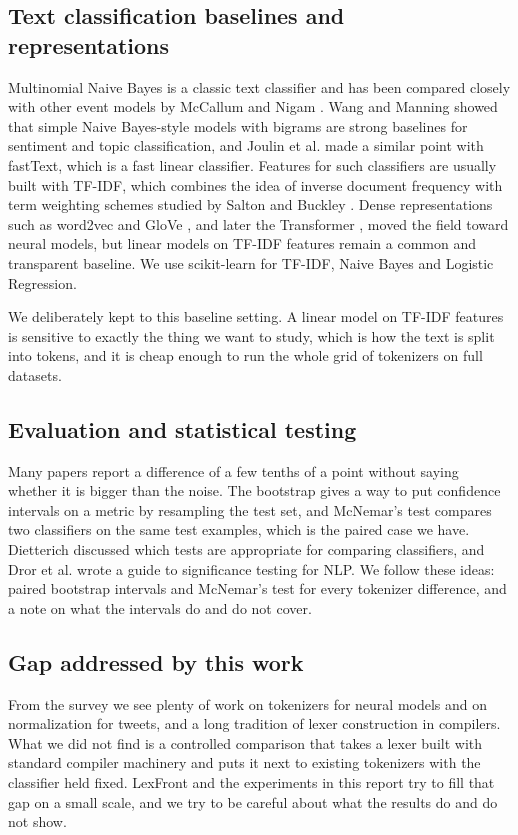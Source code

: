 \documentclass[journal,onecolumn,12pt,a4paper]{IEEEtran}
\begin{document}
\subsection{Text classification baselines and representations}\label{sec:2.4}
Multinomial Naive Bayes is a classic text classifier and has been compared closely with other event models by McCallum and Nigam \cite{r27}. Wang and Manning \cite{r28} showed that simple Naive Bayes-style models with bigrams are strong baselines for sentiment and topic classification, and Joulin et al. \cite{r29} made a similar point with fastText, which is a fast linear classifier. Features for such classifiers are usually built with TF-IDF, which combines the idea of inverse document frequency \cite{r30} with term weighting schemes studied by Salton and Buckley \cite{r31}. Dense representations such as word2vec \cite{r32} and GloVe \cite{r33}, and later the Transformer \cite{r34}, moved the field toward neural models, but linear models on TF-IDF features remain a common and transparent baseline. We use scikit-learn \cite{r35} for TF-IDF, Naive Bayes and Logistic Regression.

We deliberately kept to this baseline setting. A linear model on TF-IDF features is sensitive to exactly the thing we want to study, which is how the text is split into tokens, and it is cheap enough to run the whole grid of tokenizers on full datasets.

\subsection{Evaluation and statistical testing}\label{sec:2.5}
Many papers report a difference of a few tenths of a point without saying whether it is bigger than the noise. The bootstrap \cite{r36} gives a way to put confidence intervals on a metric by resampling the test set, and McNemar's test \cite{r37} compares two classifiers on the same test examples, which is the paired case we have. Dietterich \cite{r38} discussed which tests are appropriate for comparing classifiers, and Dror et al. \cite{r39} wrote a guide to significance testing for NLP. We follow these ideas: paired bootstrap intervals and McNemar's test for every tokenizer difference, and a note on what the intervals do and do not cover.

\subsection{Gap addressed by this work}\label{sec:2.6}
From the survey we see plenty of work on tokenizers for neural models and on normalization for tweets, and a long tradition of lexer construction in compilers. What we did not find is a controlled comparison that takes a lexer built with standard compiler machinery and puts it next to existing tokenizers with the classifier held fixed. LexFront and the experiments in this report try to fill that gap on a small scale, and we try to be careful about what the results do and do not show.
\end{document}
